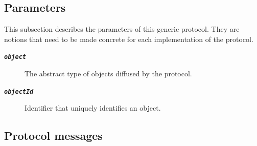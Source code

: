 \subsection{Parameters}

This subsection describes the parameters of this generic protocol.
They are notions that need to be made concrete for each implementation of the protocol.

\newcommand\argfont[1]{\textbf{\texttt{\textit{#1}}}}

\begin{description}
\item [\argfont{object}] The abstract type of objects diffused by the protocol.
\item [\argfont{objectId}] Identifier that uniquely identifies an object.
\end{description}

\subsection{Protocol messages}

